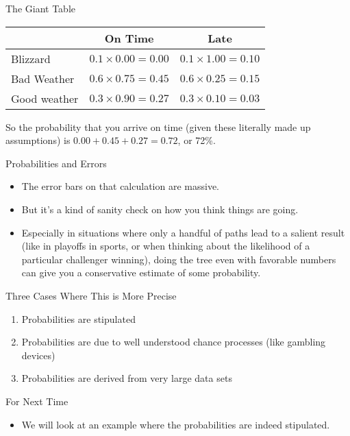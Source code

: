 \documentclass[
  ignorenonframetext,
]{beamer}
\providecommand{\tightlist}{%
  \setlength{\itemsep}{0pt}\setlength{\parskip}{0pt}}
\renewcommand{\,}{\text{, }}
\begin{document}
\begin{frame}{The Giant Table}
\protect\hypertarget{the-giant-table}{}
\begin{longtable}[]{@{}lcc@{}}
\toprule
& On Time & Late \\
\midrule
\endhead
Blizzard & \(0.1 \times 0.00 = 0.00\) & \(0.1 \times 1.00 = 0.10\) \\
Bad Weather & \(0.6 \times 0.75 = 0.45\) & \(0.6 \times 0.25 = 0.15\) \\
Good weather & \(0.3 \times 0.90 = 0.27\) &
\(0.3 \times 0.10 = 0.03\) \\
\bottomrule
\end{longtable}

So the probability that you arrive on time (given these literally made
up assumptions) is \(0.00 + 0.45 + 0.27 = 0.72\), or 72\%.
\end{frame}

\begin{frame}{Probabilities and Errors}
\protect\hypertarget{probabilities-and-errors}{}
\begin{itemize}
\tightlist
\item
  The error bars on that calculation are massive.
\item
  But it's a kind of sanity check on how you think things are going.
\item
  Especially in situations where only a handful of paths lead to a
  salient result (like in playoffs in sports, or when thinking about the
  likelihood of a particular challenger winning), doing the tree even
  with favorable numbers can give you a conservative estimate of some
  probability.
\end{itemize}
\end{frame}

\begin{frame}{Three Cases Where This is More Precise}
\protect\hypertarget{three-cases-where-this-is-more-precise}{}
\begin{enumerate}
\tightlist
\item
  Probabilities are stipulated
\item
  Probabilities are due to well understood chance processes (like
  gambling devices)
\item
  Probabilities are derived from very large data sets
\end{enumerate}
\end{frame}

\begin{frame}{For Next Time}
\protect\hypertarget{for-next-time}{}
\begin{itemize}
\tightlist
\item
  We will look at an example where the probabilities are indeed
  stipulated.
\end{itemize}
\end{frame}
\end{document}
